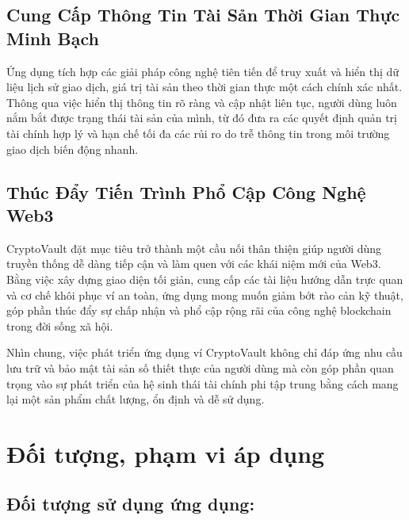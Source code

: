 \documentclass[a4paper]{report}
\begin{document}
\subsection{Cung Cấp Thông Tin Tài Sản Thời Gian Thực Minh Bạch}
Ứng dụng tích hợp các giải pháp công nghệ tiên tiến để truy xuất và hiển thị dữ liệu lịch sử giao dịch, giá trị tài sản theo thời gian thực một cách chính xác nhất. Thông qua việc hiển thị thông tin rõ ràng và cập nhật liên tục, người dùng luôn nắm bắt được trạng thái tài sản của mình, từ đó đưa ra các quyết định quản trị tài chính hợp lý và hạn chế tối đa các rủi ro do trễ thông tin trong môi trường giao dịch biến động nhanh.

\subsection{Thúc Đẩy Tiến Trình Phổ Cập Công Nghệ Web3}
CryptoVault đặt mục tiêu trở thành một cầu nối thân thiện giúp người dùng truyền thống dễ dàng tiếp cận và làm quen với các khái niệm mới của Web3. Bằng việc xây dựng giao diện tối giản, cung cấp các tài liệu hướng dẫn trực quan và cơ chế khôi phục ví an toàn, ứng dụng mong muốn giảm bớt rào cản kỹ thuật, góp phần thúc đẩy sự chấp nhận và phổ cập rộng rãi của công nghệ blockchain trong đời sống xã hội.

Nhìn chung, việc phát triển ứng dụng ví CryptoVault không chỉ đáp ứng nhu cầu lưu trữ và bảo mật tài sản số thiết thực của người dùng mà còn góp phần quan trọng vào sự phát triển của hệ sinh thái tài chính phi tập trung bằng cách mang lại một sản phẩm chất lượng, ổn định và dễ sử dụng.

\section{Đối tượng, phạm vi áp dụng}

\subsection{Đối tượng sử dụng ứng dụng:}
\end{document}
